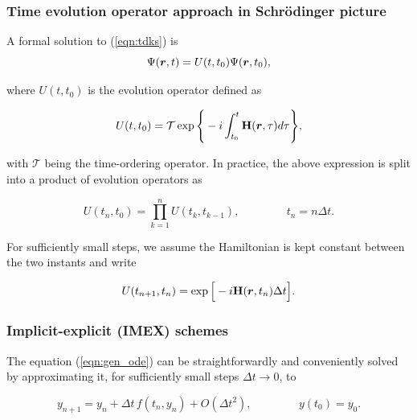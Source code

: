 \subsubsection{Time evolution operator approach in Schr\"odinger picture}

A formal solution to (\ref{eqn:tdks}) is 
\begin{equation}
   {\boldsymbol \rm \Psi}(\boldsymbol{r},t) = U(t,t_0)
   {\boldsymbol \rm \Psi}(\boldsymbol{r},t_0),
   \label{eqn:schrodinger_pic}
\end{equation}

\noindent where $U(t,t_0)$ is the evolution operator defined as

\begin{equation}
   U(t,t_0) = \mathcal{T}
     \exp\Bigg\lbrace 
     -i\int_{t_0}^{t}{\boldsymbol{\rm H}}(\boldsymbol{r},\tau)d\tau
\Bigg\rbrace,
\end{equation}

\noindent with $\mathcal{T}$ being the time-ordering operator.
In practice, the above expression is split into a product 
of evolution operators as

\begin{equation}
   U(t_n,t_0) = \prod_{k=1}^n U\left(t_k,t_{k-1}\right), \hspace{50pt}
         t_n = n\Delta t.
\end{equation}

\noindent For sufficiently small steps, we assume the Hamiltonian is kept 
constant between the two instants and write

\begin{equation}
   U(t_{n+1},t_n) = \exp\Big[
     -i{\boldsymbol{\rm H}}(\boldsymbol{r},t_n)\Delta t
\Big].
\end{equation}

\subsubsection{Implicit-explicit (IMEX) schemes}


The equation (\ref{eqn:gen_ode}) 
can be straightforwardly and conveniently solved 
by approximating it, for sufficiently small steps 
$\Delta t \longrightarrow 0$, to
  
\begin{equation}
   y_{n+1} = y_n + \Delta t\,f(t_n,y_n) + O(\Delta t^2), 
\hspace{50pt} y(t_0)=y_0.
   \label{eqn:explicit}
\end{equation}

